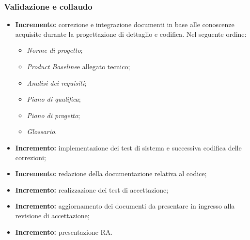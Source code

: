 \subsubsection{Validazione e collaudo }
\begin{itemize}
  \item \textbf{ Incremento:} correzione e integrazione documenti in base alle conoscenze acquisite durante la progettazione di dettaglio e codifica. Nel seguente ordine:
  \begin{itemize}
    \item \textit{Norme di progetto}\docs;
    \item \textit{Product Baseline}\glo e allegato tecnico;
    \item \textit{Analisi dei requisiti}\docs;
    \item \textit{Piano di qualifica}\docs;
    \item \textit{Piano di progetto}\docs;
    \item \textit{Glossario}\docs.
  \end{itemize}
	\item \textbf{ Incremento:} implementazione dei test di sistema e successiva codifica delle correzioni;
	\item \textbf{ Incremento:} redazione della documentazione relativa al codice;
	\item \textbf{ Incremento:} realizzazione dei test di accettazione;
	\item \textbf{ Incremento:} aggiornamento dei documenti da presentare in ingresso alla revisione di accettazione;
	\item \textbf{ Incremento:} presentazione RA.
\end{itemize}
